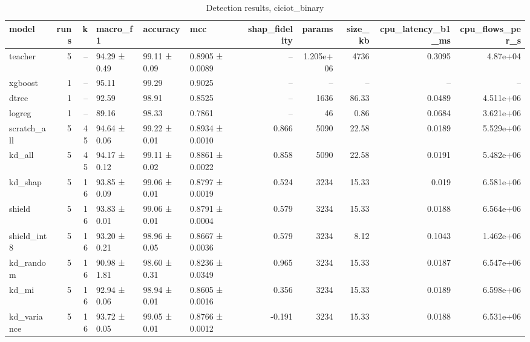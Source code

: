 \begin{table}
\caption{Detection results, ciciot_binary}
\begin{tabular}{lrrlllrrrrr}
\toprule
model & runs & k & macro_f1 & accuracy & mcc & shap_fidelity & params & size_kb & cpu_latency_b1_ms & cpu_flows_per_s \\
\midrule
teacher & 5 & -- & 94.29 ± 0.49 & 99.11 ± 0.09 & 0.8905 ± 0.0089 & -- & 1.205e+06 & 4736 & 0.3095 & 4.87e+04 \\
xgboost & 1 & -- & 95.11 & 99.29 & 0.9025 & -- & -- & -- & -- & -- \\
dtree & 1 & -- & 92.59 & 98.91 & 0.8525 & -- & 1636 & 86.33 & 0.0489 & 4.511e+06 \\
logreg & 1 & -- & 89.16 & 98.33 & 0.7861 & -- & 46 & 0.86 & 0.0684 & 3.621e+06 \\
scratch_all & 5 & 45 & 94.64 ± 0.06 & 99.22 ± 0.01 & 0.8934 ± 0.0010 & 0.866 & 5090 & 22.58 & 0.0189 & 5.529e+06 \\
kd_all & 5 & 45 & 94.17 ± 0.12 & 99.11 ± 0.02 & 0.8861 ± 0.0022 & 0.858 & 5090 & 22.58 & 0.0191 & 5.482e+06 \\
kd_shap & 5 & 16 & 93.85 ± 0.09 & 99.06 ± 0.01 & 0.8797 ± 0.0019 & 0.524 & 3234 & 15.33 & 0.019 & 6.581e+06 \\
shield & 5 & 16 & 93.83 ± 0.01 & 99.06 ± 0.01 & 0.8791 ± 0.0004 & 0.579 & 3234 & 15.33 & 0.0188 & 6.564e+06 \\
shield_int8 & 5 & 16 & 93.20 ± 0.21 & 98.96 ± 0.05 & 0.8667 ± 0.0036 & 0.579 & 3234 & 8.12 & 0.1043 & 1.462e+06 \\
kd_random & 5 & 16 & 90.98 ± 1.81 & 98.60 ± 0.31 & 0.8236 ± 0.0349 & 0.965 & 3234 & 15.33 & 0.0187 & 6.547e+06 \\
kd_mi & 5 & 16 & 92.94 ± 0.06 & 98.94 ± 0.01 & 0.8605 ± 0.0016 & 0.356 & 3234 & 15.33 & 0.0189 & 6.598e+06 \\
kd_variance & 5 & 16 & 93.72 ± 0.05 & 99.05 ± 0.01 & 0.8766 ± 0.0012 & -0.191 & 3234 & 15.33 & 0.0188 & 6.531e+06 \\
\bottomrule
\end{tabular}
\end{table}

